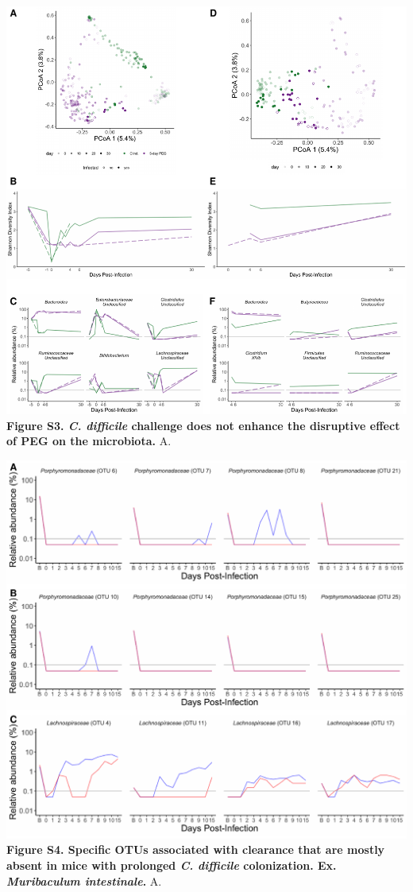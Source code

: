 \documentclass[
  11pt,
]{article}
\begin{document}
\includegraphics{figure_S3.pdf} \textbf{Figure S3. \emph{C. difficile}
challenge does not enhance the disruptive effect of PEG on the
microbiota.} A. \newpage

\includegraphics{figure_S4.pdf} \textbf{Figure S4. Specific OTUs
associated with clearance that are mostly absent in mice with prolonged
\emph{C. difficile} colonization. Ex. \emph{Muribaculum intestinale}.}
A. \newpage
\end{document}
